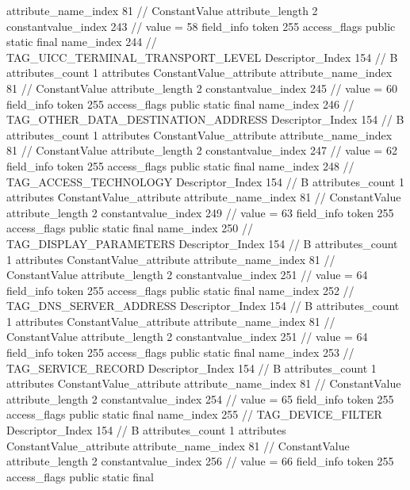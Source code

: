 {{{{{{{					attribute_name_index	81		// ConstantValue
					attribute_length	2
					constantvalue_index	243		// value = 58
				}
				}
			}
			field_info {
				token	255
				access_flags	public static final
				name_index	244		// TAG_UICC_TERMINAL_TRANSPORT_LEVEL
				Descriptor_Index	154		// B
				attributes_count	1
				attributes {
				ConstantValue_attribute {
					attribute_name_index	81		// ConstantValue
					attribute_length	2
					constantvalue_index	245		// value = 60
				}
				}
			}
			field_info {
				token	255
				access_flags	public static final
				name_index	246		// TAG_OTHER_DATA_DESTINATION_ADDRESS
				Descriptor_Index	154		// B
				attributes_count	1
				attributes {
				ConstantValue_attribute {
					attribute_name_index	81		// ConstantValue
					attribute_length	2
					constantvalue_index	247		// value = 62
				}
				}
			}
			field_info {
				token	255
				access_flags	public static final
				name_index	248		// TAG_ACCESS_TECHNOLOGY
				Descriptor_Index	154		// B
				attributes_count	1
				attributes {
				ConstantValue_attribute {
					attribute_name_index	81		// ConstantValue
					attribute_length	2
					constantvalue_index	249		// value = 63
				}
				}
			}
			field_info {
				token	255
				access_flags	public static final
				name_index	250		// TAG_DISPLAY_PARAMETERS
				Descriptor_Index	154		// B
				attributes_count	1
				attributes {
				ConstantValue_attribute {
					attribute_name_index	81		// ConstantValue
					attribute_length	2
					constantvalue_index	251		// value = 64
				}
				}
			}
			field_info {
				token	255
				access_flags	public static final
				name_index	252		// TAG_DNS_SERVER_ADDRESS
				Descriptor_Index	154		// B
				attributes_count	1
				attributes {
				ConstantValue_attribute {
					attribute_name_index	81		// ConstantValue
					attribute_length	2
					constantvalue_index	251		// value = 64
				}
				}
			}
			field_info {
				token	255
				access_flags	public static final
				name_index	253		// TAG_SERVICE_RECORD
				Descriptor_Index	154		// B
				attributes_count	1
				attributes {
				ConstantValue_attribute {
					attribute_name_index	81		// ConstantValue
					attribute_length	2
					constantvalue_index	254		// value = 65
				}
				}
			}
			field_info {
				token	255
				access_flags	public static final
				name_index	255		// TAG_DEVICE_FILTER
				Descriptor_Index	154		// B
				attributes_count	1
				attributes {
				ConstantValue_attribute {
					attribute_name_index	81		// ConstantValue
					attribute_length	2
					constantvalue_index	256		// value = 66
				}
				}
			}
			field_info {
				token	255
				access_flags	public static final
}}}}}
